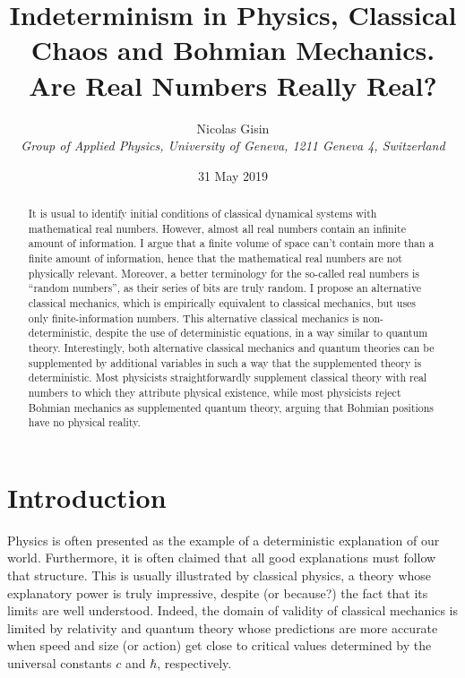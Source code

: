 \documentclass[floatfix,12pt]{article}
\begin{document}
\title{Indeterminism in Physics, Classical Chaos and Bohmian Mechanics.\\ Are Real Numbers Really Real?}
\author{Nicolas Gisin \\
\it \small   Group of Applied Physics, University of Geneva, 1211 Geneva 4,    Switzerland}

\date{\small 31 May 2019 }
\maketitle

\begin{abstract}
It is usual to identify initial conditions of classical dynamical systems with mathematical real numbers. However, almost all real numbers contain an infinite amount of information. I argue that a finite volume of space can't contain more than a finite amount of information, hence that the mathematical real numbers are not physically relevant. Moreover, a better terminology for the so-called real numbers is ``random numbers'', as their series of bits are truly random. I propose an alternative classical mechanics, which is empirically equivalent to classical mechanics, but uses only finite-information numbers. This alternative classical mechanics is non-deterministic, despite the use of deterministic equations, in a way similar to quantum theory. Interestingly, both alternative classical mechanics and quantum theories can be supplemented by additional variables in such a way that the supplemented theory is deterministic. Most physicists straightforwardly supplement classical theory with real numbers to which they attribute physical existence, while most physicists reject Bohmian mechanics as supplemented quantum theory, arguing that Bohmian positions have no physical reality. 
\end{abstract}


\newpage

\section{Introduction}\label{intro}
Physics is often presented as the example of a deterministic explanation of our world. Furthermore, it is often claimed that all good explanations must follow that structure. This is usually illustrated by classical physics, a theory whose explanatory power is truly impressive, despite (or because?) the fact that its limits are well understood. Indeed, the domain of validity of classical mechanics is limited by relativity and quantum theory whose predictions are more accurate when speed and size (or action) get close to critical values determined by the universal constants $c$ and $\hbar$, respectively. 
\end{document}
